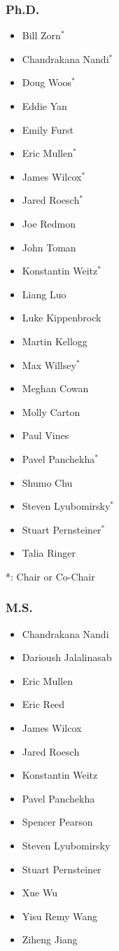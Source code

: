\documentclass[10pt]{article}
\begin{document}
\subsubsection*{Ph.D.}
\begin{itemize}
  \item Bill Zorn$^*$
  \item Chandrakana Nandi$^*$
  \item Doug Woos$^*$
  \item Eddie Yan
  \item Emily Furst
  \item Eric Mullen$^*$
  \item James Wilcox$^*$
  \item Jared Roesch$^*$
  \item Joe Redmon
  \item John Toman
  \item Konstantin Weitz$^*$
  \item Liang Luo
  \item Luke Kippenbrock
  \item Martin Kellogg
  \item Max Willsey$^*$
  \item Meghan Cowan
  \item Molly Carton
  \item Paul Vines
  \item Pavel Panchekha$^*$
  \item Shumo Chu
  \item Steven Lyubomirsky$^*$
  \item Stuart Pernsteiner$^*$
  \item Talia Ringer
\end{itemize}

*: Chair or Co-Chair

\subsubsection*{M.S.}
\begin{itemize}
  \item Chandrakana Nandi
  \item Darioush Jalalinasab
  \item Eric Mullen
  \item Eric Reed
  \item James Wilcox
  \item Jared Roesch
  \item Konstantin Weitz
  \item Pavel Panchekha
  \item Spencer Pearson
  \item Steven Lyubomirsky
  \item Stuart Pernsteiner
  \item Xue Wu
  \item Yisu Remy Wang
  \item Ziheng Jiang
\end{itemize}
\end{document}
